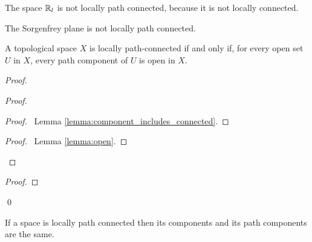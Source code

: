 \begin{example}
    The space $\mathbb{R}_l$ is not locally path connected, because it is not locally connected.
\end{example}

\begin{corollary}
    The Sorgenfrey plane is not locally path connected.
\end{corollary}

\begin{theorem}
    \label{theorem:open_path_component_locally_path_connected}
    A topological space $X$ is locally path-connected if and only if, for every
    open set $U$ in $X$, every path component of $U$ is open in $X$.
\end{theorem}

\begin{proof}
    \pf
    \begin{proof}
        \begin{proof}
            \pf\ Lemma \ref{lemma:component_includes_connected}.
        \end{proof}
        \qedstep
        \begin{proof}
            \pf\ Lemma \ref{lemma:open}.
        \end{proof}
    \end{proof}
    \begin{proof}
    \end{proof}
    \qed
\end{proof}

\begin{theorem}
    If a space is locally path connected then its components and its path components are the same.
\end{theorem}

